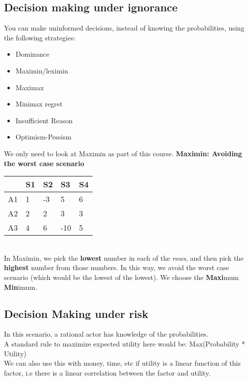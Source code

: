 \documentclass{article}
\begin{document}
    \subsection{Decision making under ignorance}
    You can make uninformed decisions, instead of knowing the probabilities, using the following strategies:
    \begin{itemize}
        \item Dominance
        \item Maximin/leximin
        \item Maximax
        \item Minimax regret
        \item Insufficient Reason
        \item Optimism-Pessism
    \end{itemize}
    We only need to look at Maximin as part of this course.
    \bigbreak \textbf{Maximin: Avoiding the worst case scenario}
    \begin{table}[h!]
    \begin{tabular}{l|llll}
       & S1 & S2 & S3  & S4 \\ \hline
    A1 & 1  & -3 & 5   & 6  \\
    A2 & 2  & 2  & 3   & 3  \\
    A3 & 4  & 6  & -10 & 5 
    \end{tabular}
    \end{table}    
    \\In Maximin, we pick the \textbf{lowest} number in each of the \textit{rows}, and then pick the \textbf{highest} number from those numbers. In this way, we avoid the worst case scenario (which would be the lowest of the lowest). We choose the \textbf{Maxi}mum \textbf{Min}imum.
    
    \subsection{Decision Making under risk}
    In this scenario, a rational actor has knowledge of the probabilities.
    \\A standard rule to maximize expected utility here would be: Max(Probability * Utility)
    \\We can also use this with money, time, etc if utility is a linear function of this factor, i.e there is a linear correlation between the factor and utility.
    
\end{document}

